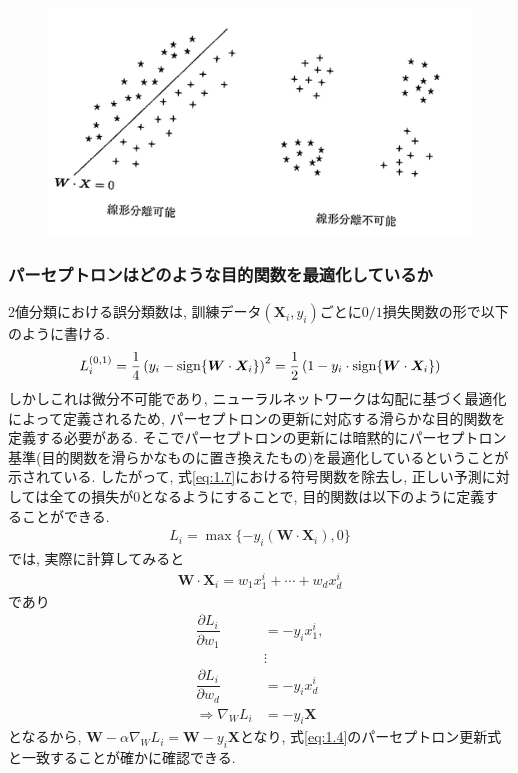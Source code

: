 \documentclass[dvipdfmx,report,11pt]{jsbook}
\begin{document}
\begin{figure}[H]
  \centering
    \includegraphics[width=0.5\linewidth]{figure/fig4.png}
    \caption{}
    \label{}
\end{figure}

\subsubsection{パーセプトロンはどのような目的関数を最適化しているか}
2値分類における誤分類数は, 訓練データ$(\bm{X}_i,y_i)$ごとに$0/1$損失関数の形で以下のように書ける.
\begin{align}
  L_{i}^{(0,1)}=\dfrac{1}{4}\left(y_i-\operatorname{sign}\{\bm{W}\cdot\bm{X}_i\}\right)^2=\dfrac{1}{2}\left(1-y_i\cdot \operatorname{sign}\{\bm{W}\cdot\bm{X}_i\}\right)\label{eq:1.7}
\end{align}
しかしこれは微分不可能であり, ニューラルネットワークは勾配に基づく最適化によって定義されるため, パーセプトロンの更新に対応する滑らかな目的関数を定義する必要がある. そこでパーセプトロンの更新には暗黙的にパーセプトロン基準(目的関数を滑らかなものに置き換えたもの)を最適化しているということが示されている. したがって, 式\eqref{eq:1.7}における符号関数を除去し, 正しい予測に対しては全ての損失が0となるようにすることで, 目的関数は以下のように定義することができる.
\begin{align}
  L_i=\operatorname{max}\{-y_i(\bm{W}\cdot \bm{X}_i),0\}
\end{align}
では, 実際に計算してみると
\begin{align*}
  \bm{W}\cdot\bm{X}_i=w_1x_1^i+\cdots+w_dx_d^i
\end{align*}
であり
\begin{align*}
  \dfrac{\partial L_i}{\partial w_1}&=-y_ix_1^i,\\
  &\vdots\\
  \dfrac{\partial L_i}{\partial w_d}&=-y_ix_d^i\\
  \Rightarrow \nabla_WL_i&=-y_i\bm{X}
\end{align*}
となるから, $\bm{W}-\alpha\nabla_WL_i=\bm{W}-y_i\bm{X}$となり, 式\eqref{eq:1.4}のパーセプトロン更新式と一致することが確かに確認できる.
\end{document}
